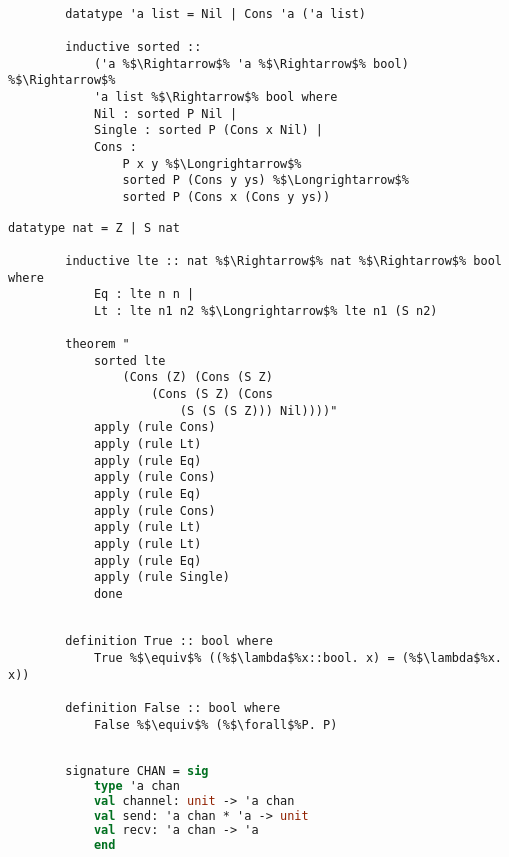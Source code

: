 \documentclass{article}
\begin{document}
    \begin{lstlisting}[style=codestyle1, escapechar=\%]

        datatype 'a list = Nil | Cons 'a ('a list)

        inductive sorted ::
            ('a %$\Rightarrow$% 'a %$\Rightarrow$% bool) %$\Rightarrow$%
            'a list %$\Rightarrow$% bool where
            Nil : sorted P Nil |
            Single : sorted P (Cons x Nil) |
            Cons :
                P x y %$\Longrightarrow$%
                sorted P (Cons y ys) %$\Longrightarrow$%
                sorted P (Cons x (Cons y ys))
        \end{lstlisting}

      
    \begin{lstlisting}[style=codestyle1, escapechar=\%]
        datatype nat = Z | S nat 

        inductive lte :: nat %$\Rightarrow$% nat %$\Rightarrow$% bool where
            Eq : lte n n |
            Lt : lte n1 n2 %$\Longrightarrow$% lte n1 (S n2)

        theorem "
            sorted lte
                (Cons (Z) (Cons (S Z)
                    (Cons (S Z) (Cons
                        (S (S (S Z))) Nil))))"
            apply (rule Cons)
            apply (rule Lt)
            apply (rule Eq)
            apply (rule Cons)
            apply (rule Eq)
            apply (rule Cons)
            apply (rule Lt)
            apply (rule Lt)
            apply (rule Eq)
            apply (rule Single)
            done
        \end{lstlisting}

    \begin{lstlisting}[style=codestyle1, escapechar=\%]

        definition True :: bool where 
            True %$\equiv$% ((%$\lambda$%x::bool. x) = (%$\lambda$%x. x))

        definition False :: bool where 
            False %$\equiv$% (%$\forall$%P. P)

        \end{lstlisting}

    \begin{lstlisting}[language=ML, style=codestyle1]

        signature CHAN = sig
            type 'a chan 
            val channel: unit -> 'a chan
            val send: 'a chan * 'a -> unit
            val recv: 'a chan -> 'a
            end       
    \end{lstlisting}
\end{document}
